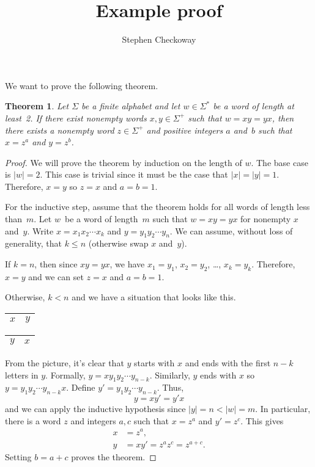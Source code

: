 \documentclass{article}
\title{Example proof}
\author{Stephen Checkoway}
\newtheorem*{thm}{Theorem}
\begin{document}
\maketitle

We want to prove the following theorem.
\begin{thm}
Let $\Sigma$ be a finite alphabet and let $w\in\Sigma^*$ be a word of
length at least~2. If there exist nonempty words $x,y\in\Sigma^+$
such that $w=xy=yx$, then there exists a nonempty word $z\in\Sigma^+$
and positive integers $a$ and~$b$ such that $x=z^a$ and $y=z^b$.
\end{thm}

\begin{proof}
We will prove the theorem by induction on the length of $w$. The base
case is $|w|=2$. This case is trivial since it must be the case that
$|x|=|y|=1$. Therefore, $x=y$ so $z=x$ and $a=b=1$.

For the inductive step, assume that the theorem holds for all words of
length less than~$m$. Let $w$~be a word of length~$m$ such that
$w=xy=yx$ for nonempty $x$ and~$y$. Write $x=x_1 x_2 \cdots x_k$ and
$y=y_1 y_2 \cdots y_n$. We can assume, without loss of generality,
that $k\le n$ (otherwise swap $x$ and~$y$).

If $k=n$, then since $xy=yx$, we have $x_1=y_1$, $x_2=y_2$, \ldots,
$x_k=y_k$. Therefore, $x=y$ and we can set $z=x$ and $a=b=1$.

Otherwise, $k<n$ and we have a situation that looks like this.

\begin{center}
\begin{tabular}{|C{2cm}|C{3cm}|}
\hline
$x$ & $y$\\
\hline
\end{tabular}

\vspace{.5\baselineskip}

\begin{tabular}{|C{3cm}|C{2cm}|}
\hline
$y$ & $x$\\
\hline
\end{tabular}
\end{center}

From the picture, it's clear that $y$ starts with $x$ and ends
with the first $n-k$ letters in $y$. Formally, $y=xy_1y_2\cdots
y_{n-k}$. Similarly, $y$ ends with $x$ so $y=y_1y_2\cdots y_{n-k}x$.
Define $y'=y_1y_2\cdots y_{n-k}$. Thus,
\[ y=xy'=y'x \]
and we can apply the inductive hypothesis since $|y|=n<|w|=m$. In
particular, there is a word $z$ and integers $a,c$ such that $x=z^a$
and $y'=z^c$. This gives
\begin{align*}
x&=z^a,\\
y&=xy'=z^az^c=z^{a+c}.
\end{align*}
Setting $b=a+c$ proves the theorem.
\end{proof}
\end{document}

